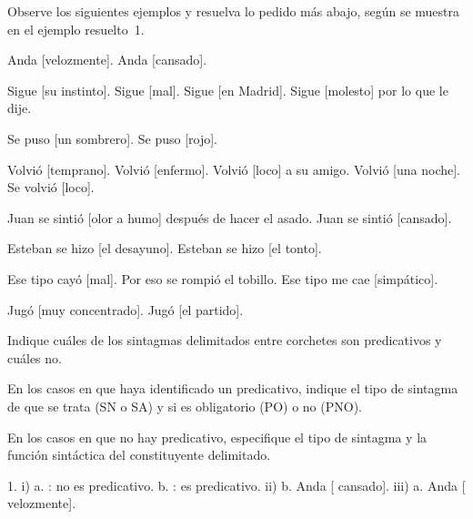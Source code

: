 \begin{ejercicio}\label{ej:09-sonono}
Observe los siguientes ejemplos y resuelva lo pedido más abajo, según se muestra
en el ejemplo resuelto~1.

\begin{exe}
  \ex
    \begin{xlist}
      \ex Anda [velozmente].
      \ex Anda [cansado].
    \end{xlist}
  \ex
    \begin{xlist}
      \ex Sigue [su instinto].
      \ex Sigue [mal].
      \ex Sigue [en Madrid].
      \ex Sigue [molesto] por lo que le dije.
    \end{xlist}
  \ex
    \begin{xlist}
      \ex Se puso [un sombrero].
      \ex Se puso [rojo].
    \end{xlist}
  \ex
    \begin{xlist}
      \ex Volvió [temprano].
      \ex Volvió [enfermo].
      \ex Volvió [loco] a su amigo.
      \ex Volvió [una noche].
      \ex Se volvió [loco].
    \end{xlist}
  \ex
    \begin{xlist}
      \ex Juan se sintió [olor a humo] después de hacer el asado.
      \ex Juan se sintió [cansado].
    \end{xlist}
  \ex
    \begin{xlist}
      \ex Esteban se hizo [el desayuno].
      \ex Esteban se hizo [el tonto].
    \end{xlist}
  \ex
    \begin{xlist}
      \ex Ese tipo cayó [mal]. Por eso se rompió el tobillo.
      \ex Ese tipo me cae [simpático].
    \end{xlist}
  \ex
    \begin{xlist}
      \ex Jugó [muy concentrado].
      \ex Jugó [el partido].
    \end{xlist}
\end{exe}

\begin{consignas}[label=\roman*)]
  \item Indique cuáles de los sintagmas delimitados entre corchetes son
        predicativos y cuáles no.
  \item En los casos en que haya identificado un predicativo, indique el tipo de
        sintagma de que se trata (SN o SA) y si es obligatorio (PO) o no (PNO).
  \item En los casos en que no hay predicativo, especifique el tipo de sintagma
        y la función sintáctica del constituyente delimitado.
\end{consignas}

\begin{resuelto}
1. i) a. : no es predicativo. b. : es predicativo. ii) b. Anda [ cansado]. iii) a. Anda
[ velozmente].
\end{resuelto}
\end{ejercicio}

